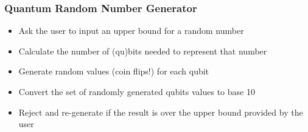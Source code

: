 \documentclass[12pt]{article}
\begin{document}

\begin{frame}
    \frametitle{Quantum Random Number Generator}

  \begin{itemize}
    \item Ask the user to input an upper bound for a random number
    \item Calculate the number of (qu)bits needed to represent that number
    \item Generate random values (coin flips!) for each qubit
    \item Convert the set of randomly generated qubits values to base 10
    \item Reject and re-generate if the result is over the upper bound provided by the user
  \end{itemize}

\end{frame}
\end{document}
